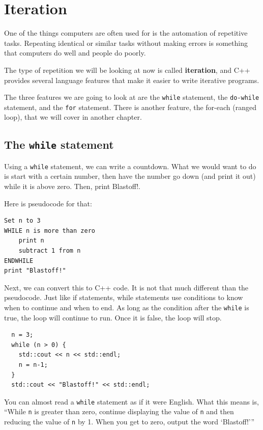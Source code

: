 
\chapter{Iteration}

One of the things computers are often used for is the automation
of repetitive tasks.  Repeating identical or similar tasks without
making errors is something that computers do well and people do
poorly.

The
type of repetition we will be looking at now is called {\bf iteration}, and C++ provides
several language features that make it easier to write iterative
programs.

The three features we are going to look at are the {\tt while}
statement, the {\tt do-while} statement, and the {\tt for} statement. There is another feature, the for-each (ranged loop), that we will cover in another chapter.

\section{The {\tt while} statement}

Using a {\tt while} statement, we can write a countdown. What we would want to do is start with a certain number, then have the number go down (and print it out) while it is above zero. Then, print Blastoff!.

Here is pseudocode for that:
\begin{verbatim}
Set n to 3
WHILE n is more than zero
    print n
    subtract 1 from n
ENDWHILE
print "Blastoff!"
\end{verbatim}

Next, we can convert this to C++ code. It is not that much different than the pseudocode. Just like if statements, while statements use conditions to know when to continue and when to end. As long as the condition after the {\tt while} is true, the loop will continue to run. Once it is false, the loop will stop.

\begin{lstlisting}
  n = 3;
  while (n > 0) {
    std::cout << n << std::endl;
    n = n-1;
  }
  std::cout << "Blastoff!" << std::endl;
\end{lstlisting}
%
You can almost read a {\tt while} statement as if it were
English.  What this means is, ``While {\tt n} is greater than
zero, continue displaying the value of {\tt n} and then reducing
the value of {\tt n} by 1.  When you get to zero, output the
word `Blastoff!'''

